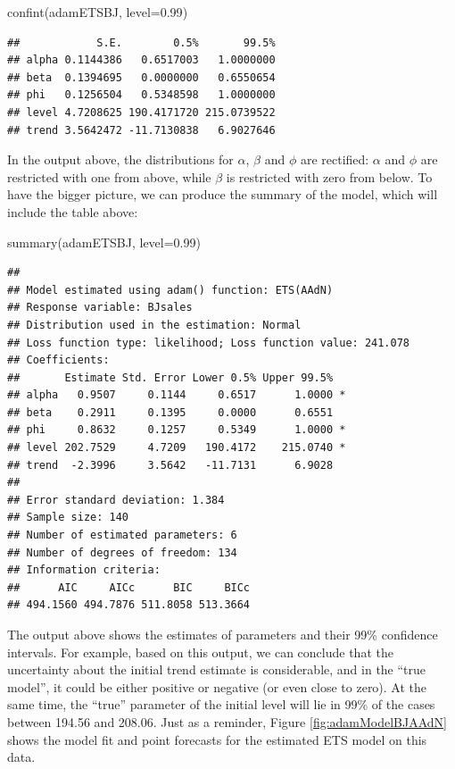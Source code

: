 \documentclass[
]{book}
\newenvironment{Shaded}{\begin{snugshade}}{\end{snugshade}}
\newcommand{\AttributeTok}[1]{\textcolor[rgb]{0.77,0.63,0.00}{#1}}
\newcommand{\FloatTok}[1]{\textcolor[rgb]{0.00,0.00,0.81}{#1}}
\newcommand{\FunctionTok}[1]{\textcolor[rgb]{0.00,0.00,0.00}{#1}}
\newcommand{\NormalTok}[1]{#1}
\theoremstyle{definition}
\theoremstyle{definition}
\theoremstyle{definition}
\theoremstyle{definition}
\theoremstyle{remark}
\begin{document}
\begin{Shaded}
\begin{Highlighting}[]
\FunctionTok{confint}\NormalTok{(adamETSBJ, }\AttributeTok{level=}\FloatTok{0.99}\NormalTok{)}
\end{Highlighting}
\end{Shaded}

\begin{verbatim}
##            S.E.        0.5%       99.5%
## alpha 0.1144386   0.6517003   1.0000000
## beta  0.1394695   0.0000000   0.6550654
## phi   0.1256504   0.5348598   1.0000000
## level 4.7208625 190.4171720 215.0739522
## trend 3.5642472 -11.7130838   6.9027646
\end{verbatim}

In the output above, the distributions for \(\alpha\), \(\beta\) and \(\phi\) are rectified: \(\alpha\) and \(\phi\) are restricted with one from above, while \(\beta\) is restricted with zero from below. To have the bigger picture, we can produce the summary of the model, which will include the table above:

\begin{Shaded}
\begin{Highlighting}[]
\FunctionTok{summary}\NormalTok{(adamETSBJ, }\AttributeTok{level=}\FloatTok{0.99}\NormalTok{)}
\end{Highlighting}
\end{Shaded}

\begin{verbatim}
## 
## Model estimated using adam() function: ETS(AAdN)
## Response variable: BJsales
## Distribution used in the estimation: Normal
## Loss function type: likelihood; Loss function value: 241.078
## Coefficients:
##       Estimate Std. Error Lower 0.5% Upper 99.5%  
## alpha   0.9507     0.1144     0.6517      1.0000 *
## beta    0.2911     0.1395     0.0000      0.6551  
## phi     0.8632     0.1257     0.5349      1.0000 *
## level 202.7529     4.7209   190.4172    215.0740 *
## trend  -2.3996     3.5642   -11.7131      6.9028  
## 
## Error standard deviation: 1.384
## Sample size: 140
## Number of estimated parameters: 6
## Number of degrees of freedom: 134
## Information criteria:
##      AIC     AICc      BIC     BICc 
## 494.1560 494.7876 511.8058 513.3664
\end{verbatim}

The output above shows the estimates of parameters and their 99\% confidence intervals. For example, based on this output, we can conclude that the uncertainty about the initial trend estimate is considerable, and in the ``true model'', it could be either positive or negative (or even close to zero). At the same time, the ``true'' parameter of the initial level will lie in 99\% of the cases between 194.56 and 208.06. Just as a reminder, Figure \ref{fig:adamModelBJAAdN} shows the model fit and point forecasts for the estimated ETS model on this data.
\end{document}
